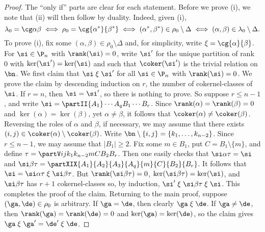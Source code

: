 \begin{proof} The ``only if'' parts are clear for each statement.
%
Before we prove (i), we note that (ii) will then follow by duality.  Indeed, given (i),
\[
\lambda_0=\cg\alpha\beta \iff \rho_0=\cg{\alpha^*}{\beta^*} \iff (\alpha^*,\beta^*)\in\rho_0\setminus\Delta \iff (\alpha,\beta)\in\lambda_0\setminus\Delta.
\]
To prove (i),
fix some $(\alpha,\beta)\in\rho_0\setminus\Delta$ and, for simplicity, write ${\mathrel\xi}=\cg{\alpha}{\beta}$.  For $\si\in\P_n$ with $\rank(\si)=0$, write $\si'$ for the unique partition of rank~$0$ with $\ker(\si')=\ker(\si)$ and such that $\coker(\si')$ is the trivial relation on $\bn$.
%
We first claim that $\si\mathrel\xi\si'$ for all $\si\in\P_n$ with $\rank(\si)=0$.  We prove the claim by descending induction on $r$, the number of cokernel-classes of~$\si$.  If $r=n$, then $\si=\si'$, so there is nothing to prove.  So suppose
$r\leq n-1$, and write $\si=\partII{A_1}\cdots{A_q}{B_1}\cdots{B_r}$.
%
Since $\rank(\alpha)=\rank(\beta)=0$ and $\ker(\alpha)=\ker(\beta)$, yet $\alpha\not=\beta$, it follows that $\coker(\alpha)\not=\coker(\beta)$.  Reversing the roles of $\alpha$ and $\beta$, if necessary, we may assume that there exists $(i,j)\in\coker(\alpha)\setminus\coker(\beta)$.
Write $\bn\setminus\{i,j\}=\{k_1,\ldots,k_{n-2}\}$.
%
Since $r\leq n-1$, we may assume that $|B_1|\geq2$.  Fix some $m\in B_1$, put $C=B_1\setminus\{m\}$, and define $\tau=\partV ij{k_1}{k_{n-2}}{m}{C}{B_2}{B_r}$.
%
Then one easily checks that $\si\alpha\tau = \si$ and $\si\beta\tau = \partXIX{A_1}{A_2}{A_3}{A_q}{m}{C}{B_2}{B_r}$.  It follows that $\si=\si\alpha\tau\mathrel\xi\si\beta\tau$.  But $\rank(\si\beta\tau)=0$, $\ker(\si\beta\tau)=\ker(\si)$, and $\si\beta\tau$ has $r+1$ cokernel-classes so, by induction, $\si'\mathrel\xi\si\beta\tau\mathrel\xi\si$.  This completes the proof of the claim.
%
Returning to the main proof, suppose $(\ga,\de)\in\rho_0$ is arbitrary.  If $\ga=\de$, then clearly $\ga\mathrel\xi\de$.  If $\ga\not=\de$, then $\rank(\ga)=\rank(\de)=0$ and $\ker(\ga)=\ker(\de)$, so the claim gives $\ga\mathrel\xi\ga'=\de'\mathrel\xi\de$.


\end{proof}
